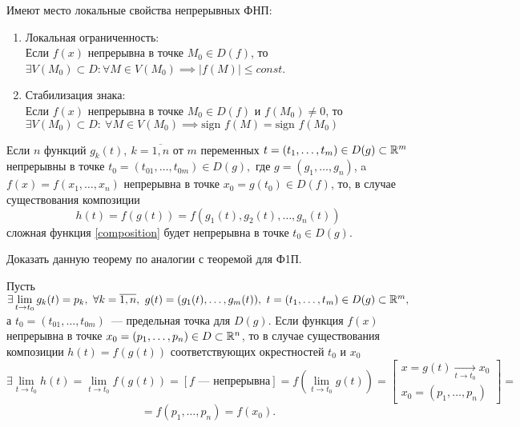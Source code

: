 \documentclass[../../main.tex]{subfiles}
\begin{document}
    Имеют место локальные свойства непрерывных ФНП:
    \begin{enumerate}
    	\item Локальная ограниченность: \\
    	Если $f(x)$ непрерывна в точке $M_0 \in D(f)$, то $\exists V(M_0)
    	\subset D : \forall M \in V(M_0) \implies |f(M)| \leq const$.
    	\item Стабилизация знака: \\
    	Если $f(x)$ непрерывна в точке $M_0 \in D(f)$ и $f(M_0) \ne 0$, то 
       $\exists V(M_0) \subset D: \ \forall M \in V(M_0) 
       \implies \text{sign }
       f(M)	= \text{sign }f(M_0)$
    \end{enumerate}
    \begin{thm}
    	Если $n$ функций $g_k(t),\ k = 
    	\overline{1,n}$ от $m$ переменных $t = (t_1, \ldots, t_m) \in D(g) 
    	\subset \mathbb{R}^m$ непрерывны в точке $t_0 = \left( t_{01}, \ldots, t_{0m} 
    	\right) \in D(g),$ где $g = (g_1, \ldots, g_n)$, a $f(x) = 
    	f(x_1, \ldots, x_n)$ непрерывна в точке $x_0 = g(t_0) \in D(f)$,
    	то, в случае существования композиции 
    	\begin{equation}
    	\label{composition}
    		h(t) = f(g(t)) = f(g_1(t), g_2(t), \ldots, g_n(t))
    	\end{equation}
        сложная функция \eqref{composition} будет непрерывна в точке 
        $t_0 \in D(g)$.
    \end{thm}
    \begin{exc}
    	Доказать данную теорему по аналогии с теоремой для Ф1П.
    \end{exc}
    \begin{crl*}
    	Пусть $\exists \lim\limits_{t \to t_0}g_k(t) = p_k, \ 
    	\forall k = \overline{1, n}, \  g(t) = (g_1(t), 
    	\ldots, g_m(t)),\ t = (t_1,
    	 \ldots, t_m) \in D(g) \subset \R^m,$ а $t_0 = 
    	 (t_{01}, \ldots, t_{0m})$~---
    	предельная точка для $D(g)$. Если функция $f(x)$ непрерывна в точке 
    	$x_0 = (p_1, \ldots, p_n) \in D \subset \mathbb{R}^n$, то в случае 
    	существования композиции $h(t) = f(g(t))$ соответствующих окрестностей
    	$t_0$ и $x_0$ 
    	\[
    	    \exists \lim\limits_{t \to t_0}h(t) = \lim\limits_{t \to t_0}f(g(t)) =
    		\left[f\text{~--- непрерывна}\right] = f(\lim\limits_{t \to t_0}g(t)) = 
    		\left[
    		\begin{array}{l}
    			x = g(t) \underset{t \to t_0}{\to} x_0 \\
    			x_0 = (p_1, \ldots, p_n) 
    		\end{array}
    		\right] = 
    	\]
    	\[
    		= f(p_1, \ldots, p_n) = f(x_0).
    	\]
    \end{crl*}
\end{document}
